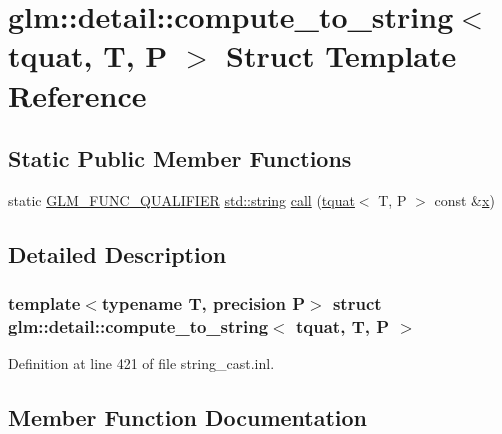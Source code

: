 \hypertarget{structglm_1_1detail_1_1compute__to__string_3_01tquat_00_01_t_00_01_p_01_4}{}\section{glm\+::detail\+::compute\+\_\+to\+\_\+string$<$ tquat, T, P $>$ Struct Template Reference}
\label{structglm_1_1detail_1_1compute__to__string_3_01tquat_00_01_t_00_01_p_01_4}
\subsection*{Static Public Member Functions}
\begin{DoxyCompactItemize}
\item 
static \mbox{\hyperlink{setup_8hpp_a33fdea6f91c5f834105f7415e2a64407}{G\+L\+M\+\_\+\+F\+U\+N\+C\+\_\+\+Q\+U\+A\+L\+I\+F\+I\+ER}} \mbox{\hyperlink{glad_8h_ac83513893df92266f79a515488701770}{std\+::string}} \mbox{\hyperlink{structglm_1_1detail_1_1compute__to__string_3_01tquat_00_01_t_00_01_p_01_4_abc8c7e5ad982ee05c7c33fb22ab86fcc}{call}} (\mbox{\hyperlink{structglm_1_1tquat}{tquat}}$<$ T, P $>$ const \&\mbox{\hyperlink{glad_8h_a92d0386e5c19fb81ea88c9f99644ab1d}{x}})
\end{DoxyCompactItemize}


\subsection{Detailed Description}
\subsubsection*{template$<$typename T, precision P$>$\newline
struct glm\+::detail\+::compute\+\_\+to\+\_\+string$<$ tquat, T, P $>$}



Definition at line 421 of file string\+\_\+cast.\+inl.



\subsection{Member Function Documentation}
\mbox{\label{structglm_1_1detail_1_1compute__to__string_3_01tquat_00_01_t_00_01_p_01_4_abc8c7e5ad982ee05c7c33fb22ab86fcc}} 
